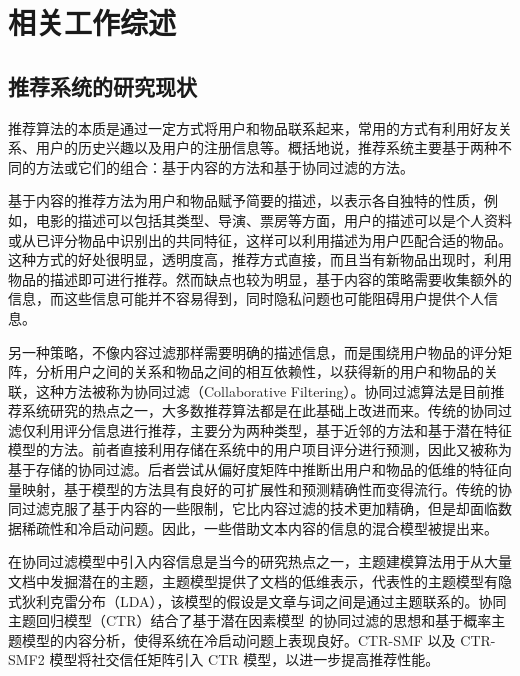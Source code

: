 \chapter{相关工作综述}

\section{推荐系统的研究现状}

推荐算法的本质是通过一定方式将用户和物品联系起来，常用的方式有利用好友关系、用户的历史兴趣以及用户的注册信息等\cite{项亮2012推荐系统实践}。概括地说，推荐系统主要基于两种不同的方法或它们的组合：基于内容的方法和基于协同过滤的方法。

基于内容的推荐方法为用户和物品赋予简要的描述，以表示各自独特的性质，例如，电影的描述可以包括其类型、导演、票房等方面，用户的描述可以是个人资料或从已评分物品中识别出的共同特征，这样可以利用描述为用户匹配合适的物品。这种方式的好处很明显，透明度高，推荐方式直接，而且当有新物品出现时，利用物品的描述即可进行推荐。然而缺点也较为明显，基于内容的策略需要收集额外的信息，而这些信息可能并不容易得到，同时隐私问题也可能阻碍用户提供个人信息\cite{Koren2009Matrix}。

另一种策略，不像内容过滤那样需要明确的描述信息，而是围绕用户物品的评分矩阵，分析用户之间的关系和物品之间的相互依赖性，以获得新的用户和物品的关联，这种方法被称为协同过滤（Collaborative Filtering）\cite{Goldberg1992Using}。协同过滤算法是目前推荐系统研究的热点之一，大多数推荐算法都是在此基础上改进而来。传统的协同过滤仅利用评分信息进行推荐\cite{shi2014collaborative}，主要分为两种类型，基于近邻的方法\cite{Desrosiers2011A,Sarwar2001Item,Deshpande2004Item}和基于潜在特征模型的方法\cite{xu2015ice}。前者直接利用存储在系统中的用户项目评分进行预测，因此又被称为基于存储的协同过滤。后者尝试从偏好度矩阵中推断出用户和物品的低维的特征向量映射，基于模型的方法具有良好的可扩展性和预测精确性而变得流行。传统的协同过滤克服了基于内容的一些限制，它比内容过滤的技术更加精确，但是却面临数据稀疏性和冷启动问题。因此，一些借助文本内容的信息的混合模型被提出来。

在协同过滤模型中引入内容信息是当今的研究热点之一，主题建模算法\cite{blei2009topic}用于从大量文档中发掘潜在的主题，主题模型提供了文档的低维表示\cite{Chang2009Reading}，代表性的主题模型有隐式狄利克雷分布（LDA）\cite{Blei2003Latent}，该模型的假设是文章与词之间是通过主题联系的。协同主题回归模型（CTR）\cite{Wang2011Collaborative}结合了基于潜在因素模型 \cite{Agarwal2009Regression,Salakhutdinov2007Probabilistic} 的协同过滤的思想和基于概率主题模型的内容分析\cite{Blei2003Latent,Chang2009Reading,Agarwal2010fLDA}，使得系统在冷启动问题上表现良好。CTR-SMF \cite{purushotham2012collaborative} 以及 CTR-SMF2 \cite{chen2014context} 模型将社交信任矩阵引入 CTR 模型，以进一步提高推荐性能。


